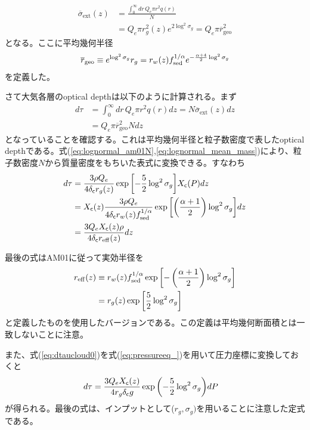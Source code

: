\begin{align}
\overline{\sigma}_\mathrm{ext}(z) &= \frac{\int_0^\infty dr \, Q_e \pi r^2 q(r)}{N} \\
&=  Q_e \pi r_g^2(z) e^{2\log^2{\sigma_g}} = Q_e \pi \overline{r}_\mathrm{geo}^2 
\end{align}
となる。ここに平均幾何半径
\begin{align}
\overline{r}_\mathrm{geo} \equiv e^{\log^2{\sigma_g}} r_g = r_w(z) f_\mathrm{sed}^{1/\alpha} e^{-\frac{\alpha+4}{2} \log^2{\sigma_g}} 
\end{align}
を定義した。

さて大気各層のoptical depthは以下のように計算される。まず
\begin{align}
d \tau &= \int_0^\infty dr \, Q_e \pi r^2 q(r) d z = N \overline{\sigma}_\mathrm{ext}(z) dz \\
&= Q_e \pi \overline{r}_\mathrm{geo}^2 N dz  
\end{align}
となっていることを確認する。これは平均幾何半径と粒子数密度で表したoptical depthである。式(\ref{eq:lognormal_am01N},\ref{eq:lognormal_mean_mass})により、粒子数密度$N$から質量密度をもちいた表式に変換できる。すなわち
\begin{align}
\label{eq:dtaucloud0}
d \tau &= \frac{3  \rho Q_e }{4 \delta_{\mathsf{c}} r_g(z)} \exp{\left[ - \frac{5}{2} \log^2{\sigma_g} \right]}  X_{\mathsf{c}} (P) dz \\
&= X_{\mathsf{c}}  (z) \frac{3 \rho Q_e }{4 \delta_{\mathsf{c}} r_w(z) f_\mathrm{sed}^{1/\alpha}}  \exp{\left[ \left( \frac{\alpha + 1}{2} \right) \log^2{\sigma_g} \right]} dz \\
\label{eq:dtaucloud1}
&= \frac{3 Q_e X_{\mathsf{c}}  (z) \rho}{4 \delta_{\mathsf{c}} r_\mathrm{eff}(z)} 
dz 
\end{align}

最後の式はAM01に従って実効半径を
\begin{align}
r_\mathrm{eff}(z) &\equiv r_w(z) f_\mathrm{sed}^{1/\alpha} \exp{\left[ - \left( \frac{\alpha + 1}{2} \right) \log^2{\sigma_g} \right]} \\
&= r_g(z)  \exp{\left[ \frac{5}{2} \log^2{\sigma_g} \right]}
\end{align} 
と定義したものを使用したバージョンである。この定義は平均幾何断面積とは一致しないことに注意。



また、式(\ref{eq:dtaucloud0})を式(\ref{eq:pressureeq_})を用いて圧力座標に変換しておくと
\begin{align}
d \tau &=  \frac{3 Q_e X_{\mathsf{c}} (z)}{4 r_g \delta_{\mathsf{c}} g}  \exp{\left(- \frac{5}{2} \log^2{\sigma_g}\right)} dP
\end{align}
が得られる。最後の式は、インプットとして($r_g, \sigma_g)$を用いることに注意した定式である。

